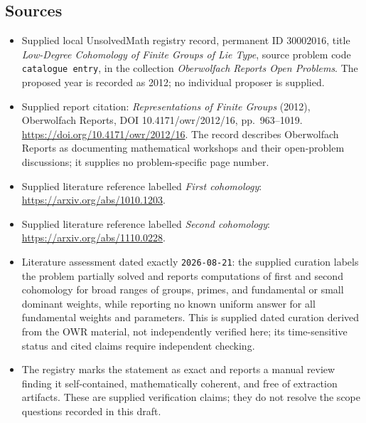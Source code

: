 \documentclass[11pt]{article}
\begin{document}
\subsection{Sources}
\begin{itemize}
\item Supplied local UnsolvedMath registry record, permanent ID \(30002016\), title \emph{Low-Degree Cohomology of Finite Groups of Lie Type}, source problem code \texttt{catalogue entry}, in the collection \emph{Oberwolfach Reports Open Problems}. The proposed year is recorded as 2012; no individual proposer is supplied.
\item Supplied report citation: \emph{Representations of Finite Groups} (2012), Oberwolfach Reports, DOI 10.4171/owr/2012/16, pp.\ 963--1019. \url{https://doi.org/10.4171/owr/2012/16}. The record describes Oberwolfach Reports as documenting mathematical workshops and their open-problem discussions; it supplies no problem-specific page number.
\item Supplied literature reference labelled \emph{First cohomology}: \url{https://arxiv.org/abs/1010.1203}.
\item Supplied literature reference labelled \emph{Second cohomology}: \url{https://arxiv.org/abs/1110.0228}.
\item Literature assessment dated exactly \texttt{2026-08-21}: the supplied curation labels the problem partially solved and reports computations of first and second cohomology for broad ranges of groups, primes, and fundamental or small dominant weights, while reporting no known uniform answer for all fundamental weights and parameters. This is supplied dated curation derived from the OWR material, not independently verified here; its time-sensitive status and cited claims require independent checking.
\item The registry marks the statement as exact and reports a manual review finding it self-contained, mathematically coherent, and free of extraction artifacts. These are supplied verification claims; they do not resolve the scope questions recorded in this draft.
\end{itemize}
\end{document}
